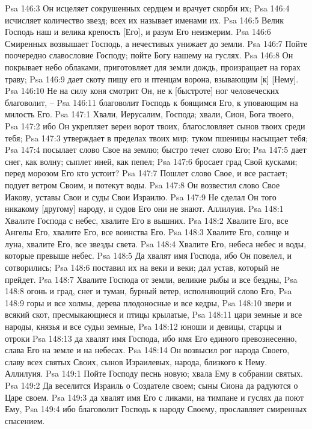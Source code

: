 Psa 146:3  Он исцеляет сокрушенных сердцем и врачует скорби их;
Psa 146:4  исчисляет количество звезд; всех их называет именами их.
Psa 146:5  Велик Господь наш и велика крепость [Его], и разум Его неизмерим.
Psa 146:6  Смиренных возвышает Господь, а нечестивых унижает до земли.
Psa 146:7  Пойте поочередно славословие Господу; пойте Богу нашему на гуслях.
Psa 146:8  Он покрывает небо облаками, приготовляет для земли дождь, произращает на горах траву;
Psa 146:9  дает скоту пищу его и птенцам ворона, взывающим [к] [Нему].
Psa 146:10  Не на силу коня смотрит Он, не к [быстроте] ног человеческих благоволит, --
Psa 146:11  благоволит Господь к боящимся Его, к уповающим на милость Его.
Psa 147:1  Хвали, Иерусалим, Господа; хвали, Сион, Бога твоего,
Psa 147:2  ибо Он укрепляет вереи ворот твоих, благословляет сынов твоих среди тебя;
Psa 147:3  утверждает в пределах твоих мир; туком пшеницы насыщает тебя;
Psa 147:4  посылает слово Свое на землю; быстро течет слово Его;
Psa 147:5  дает снег, как волну; сыплет иней, как пепел;
Psa 147:6  бросает град Свой кусками; перед морозом Его кто устоит?
Psa 147:7  Пошлет слово Свое, и все растает; подует ветром Своим, и потекут воды.
Psa 147:8  Он возвестил слово Свое Иакову, уставы Свои и суды Свои Израилю.
Psa 147:9  Не сделал Он того никакому [другому] народу, и судов Его они не знают. Аллилуия.
Psa 148:1  Хвалите Господа с небес, хвалите Его в вышних.
Psa 148:2  Хвалите Его, все Ангелы Его, хвалите Его, все воинства Его.
Psa 148:3  Хвалите Его, солнце и луна, хвалите Его, все звезды света.
Psa 148:4  Хвалите Его, небеса небес и воды, которые превыше небес.
Psa 148:5  Да хвалят имя Господа, ибо Он повелел, и сотворились;
Psa 148:6  поставил их на веки и веки; дал устав, который не прейдет.
Psa 148:7  Хвалите Господа от земли, великие рыбы и все бездны,
Psa 148:8  огонь и град, снег и туман, бурный ветер, исполняющий слово Его,
Psa 148:9  горы и все холмы, дерева плодоносные и все кедры,
Psa 148:10  звери и всякий скот, пресмыкающиеся и птицы крылатые,
Psa 148:11  цари земные и все народы, князья и все судьи земные,
Psa 148:12  юноши и девицы, старцы и отроки
Psa 148:13  да хвалят имя Господа, ибо имя Его единого превознесенно, слава Его на земле и на небесах.
Psa 148:14  Он возвысил рог народа Своего, славу всех святых Своих, сынов Израилевых, народа, близкого к Нему. Аллилуия.
Psa 149:1  Пойте Господу песнь новую; хвала Ему в собрании святых.
Psa 149:2  Да веселится Израиль о Создателе своем; сыны Сиона да радуются о Царе своем.
Psa 149:3  да хвалят имя Его с ликами, на тимпане и гуслях да поют Ему,
Psa 149:4  ибо благоволит Господь к народу Своему, прославляет смиренных спасением.
